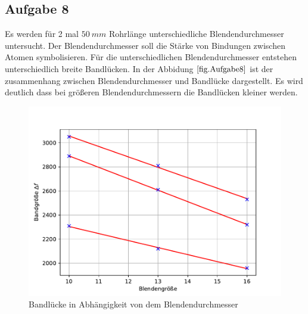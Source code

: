 \subsection{Aufgabe 8}
Es werden für 2 mal $\SI{50}{mm}$ Rohrlänge unterschiedliche Blendendurchmesser untersucht. Der Blendendurchmesser soll die Stärke von Bindungen zwischen Atomen symbolisieren.
Für die unterschiedlichen Blendendurchmesser entstehen unterschiedlich breite Bandlücken.
In der Abbidung $\ref{fig.Aufgabe8}$ ist der zusammenhang zwischen Blendendurchmesser und Bandlücke dargestellt.
Es wird deutlich dass bei größeren Blendendurchmessern die Bandlücken kleiner werden.
\begin{figure}[h!]
  \centering
  \includegraphics[width=\textwidth]{A8.pdf}
  \caption{Bandlücke in Abhängigkeit von dem Blendendurchmesser}
  \label{fig.Aufgabe8}
\end{figure}
\FloatBarrier
